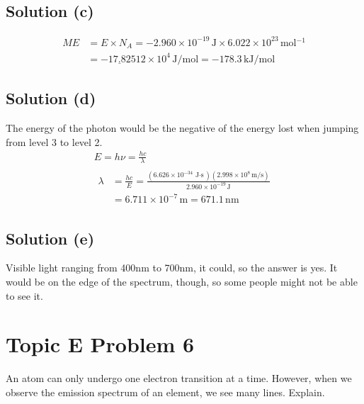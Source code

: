 \documentclass[10pt]{article}
\newcommand{\E}[1]{\times 10^{#1}}
\newcommand{\U}[1]{\underline{#1}}
\begin{document}
        \subsection{Solution (c)}
            \begin{align}
                ME  &=  E \times N_A
                    =   -2.960\E{-19}\,\unit{\joule} \times 6.022\E{23}\,\unit{\mole^{-1}}\\
                    &=  -\U{17.82}512\E{4}\,\unit{\joule/\mole}
                    =   \boxed{-178.3\,\unit{\kilo\joule/\mole}}
            \end{align}

        \subsection{Solution (d)}
            The energy of the photon would be the negative of the energy lost when jumping from level 3 to level 2.
            \begin{gather}
                E   =   h\nu
                    =   \frac{hc}{\lambda}\\
                \begin{align}
                    \lambda &=  \frac{hc}{E}
                        =   \frac{(6.626\E{-34}\,\unit{\joule\cdot\second})(2.998\E{8}\,\unit{\meter/\second})}{2.960\E{-19}\,\unit{\joule}}\\
                        &=  6.711\E{-7}\,\unit{\meter}
                        =   \boxed{671.1\,\unit{\nano\meter}}
                \end{align}
            \end{gather}
        
        \subsection{Solution (e)}
            Visible light ranging from 400nm to 700nm, it could, so the answer is yes.
            It would be on the edge of the spectrum, though, so some people might not be able to see it.

    \section{Topic E Problem 6}
        An atom can only undergo one electron transition at a time. 
        However, when we observe the emission spectrum of an element, we see many lines. 
        Explain.
\end{document}
